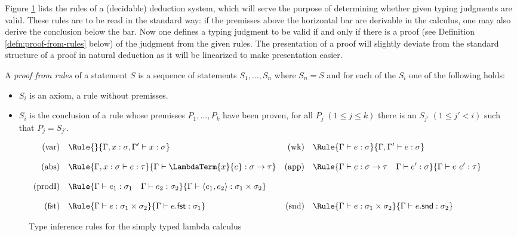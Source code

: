 Figure \ref{fig:rules-typed-lambda} lists the rules of a (decidable) deduction
system, which will serve the purpose of determining whether given typing
judgments are valid. These rules are to be read in the standard way: if the
premisses above the horizontal bar are derivable in the calculus, one may also
derive the conclusion below the bar. Now one defines a typing judgment to be
valid if and only if there is a proof (see Definition
\ref{defn:proof-from-rules} below) of the judgment from the given rules. The
presentation of a proof will slightly deviate from the standard structure of a
proof in natural deduction as it will be linearized to make presentation easier.

\begin{defn}
\label{defn:proof-from-rules}
A \emph{proof from rules} of a statement $S$ is a sequence of statements
$S_1,\ldots,S_n$ where $S_n = S$ and for each of the $S_i$ one of the following
holds:
\begin{itemize}
\item $S_i$ is an axiom, \IE a rule without premisses.
\item $S_i$ is the conclusion of a rule whose premisses $P_1,\ldots,P_k$ 
  have been proven, \IE for all $P_j \;(1\leq j\leq k)$ there is an $S_{j'} \;(1\leq j'<i)$
  such that $P_j = S_{j'}$.
\end{itemize}
\end{defn}


\begin{figure}
  \begin{align*}
    \mathrm{(var)}\quad& \Rule{}{\Gamma, x:\sigma, \Gamma' \vdash x:\sigma} &
    \mathrm{(wk)} \quad& \Rule{\Gamma \vdash e : \sigma}{\Gamma,\Gamma' \vdash e : \sigma}\\[2ex]
    \mathrm{(abs)}\quad & \Rule{\Gamma, x:\sigma \vdash e:\tau}{\Gamma \vdash \LambdaTerm{x}{e} : \sigma\to\tau} &
    \mathrm{(app)}\quad & \Rule{\Gamma \vdash e : \sigma\to\tau \quad \Gamma \vdash e' : \sigma}
    {\Gamma \vdash e\ e' : \tau}\\[2ex]
    \mathrm{(prodI)}\quad & \Rule{\Gamma \vdash e_1:\sigma_1 \quad \Gamma \vdash e_2:\sigma_2}
    {\Gamma \vdash \langle e_1,e_2\rangle : \sigma_1 \times \sigma_2}\\[2ex]
    \mathrm{(fst)} \quad & \Rule{\Gamma \vdash e : \sigma_1 \times \sigma_2}{\Gamma \vdash e.\mathsf{fst} : \sigma_1} &
    \mathrm{(snd)} \quad & \Rule{\Gamma \vdash e : \sigma_1 \times \sigma_2}{\Gamma \vdash e.\mathsf{snd} : \sigma_2} &
  \end{align*}
  \caption{Type inference rules for the simply typed lambda calculus}
  \label{fig:rules-typed-lambda}
\end{figure}


